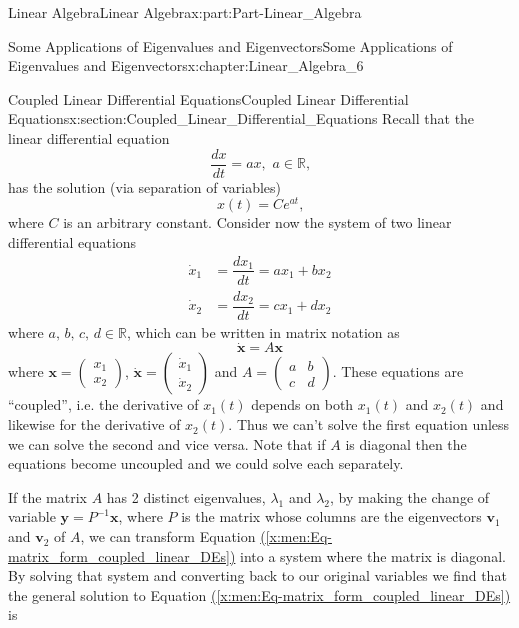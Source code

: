 \documentclass[oneside,10pt,]{book}
\newcommand{\xreffont}{\relax}
\numberwithin{equation}{section}
\newcommand{\bm}[1]{\boldsymbol{#1}}
\newcommand{\amp}{&}
\begin{document}
\begin{partptx}{Linear Algebra}{}{Linear Algebra}{}{}{x:part:Part-Linear_Algebra}
\begin{chapterptx}{Some Applications of Eigenvalues and Eigenvectors}{}{Some Applications of Eigenvalues and Eigenvectors}{}{}{x:chapter:Linear_Algebra_6}
\begin{sectionptx}{Coupled Linear Differential Equations}{}{Coupled Linear Differential Equations}{}{}{x:section:Coupled_Linear_Differential_Equations}
Recall that the linear differential equation%
\begin{equation*}
\dfrac{dx}{dt} = ax, \, \, a \in \mathbb{R}\text{,}
\end{equation*}
has the solution (via separation of variables)%
\begin{equation*}
x(t) = C e^{at}\text{,}
\end{equation*}
where \(C\) is an arbitrary constant. Consider now the system of two linear differential equations%
\begin{align*}
\dot{x}_1 \amp = \dfrac{dx_1}{dt} = ax_1 + bx_2\\
\dot{x}_2 \amp = \dfrac{dx_2}{dt} = cx_1 + dx_2
\end{align*}
where \(a, \, b, \, c, \, d \in \mathbb{R}\), which can be written in matrix notation as%
\begin{equation}
\dot{\bm{x}} = A \bm{x}\label{x:men:Eq-matrix_form_coupled_linear_DEs}
\end{equation}
where \(\bm{x} = \begin{pmatrix} x_1 \\ x_2 \end{pmatrix}\), \(\dot{\bm{x}} = \begin{pmatrix} \dot{x}_1 \\ \dot{x}_2 \end{pmatrix}\) and \(A = \begin{pmatrix} a \amp b \\ c \amp d \end{pmatrix}\). These equations are ``coupled'', i.e. the derivative of \(x_1(t)\) depends on both \(x_1(t)\) and \(x_2(t)\) and likewise for the derivative of \(x_2(t)\). Thus we can’t solve the first equation unless we can solve the second and vice versa. Note that if \(A\) is diagonal then the equations become uncoupled and we could solve each separately.%
\par
If the matrix \(A\) has 2 distinct eigenvalues, \(\lambda_1\) and \(\lambda_2\), by making the change of variable \(\bm{y} = P^{-1} \bm{x}\), where \(P\) is the matrix whose columns are the eigenvectors \(\bm{v}_1\) and \(\bm{v}_2\) of \(A\), we can transform Equation \hyperref[x:men:Eq-matrix_form_coupled_linear_DEs]{({\xreffont\ref{x:men:Eq-matrix_form_coupled_linear_DEs}})} into a system where the matrix is diagonal. By solving that system and converting back to our original variables we find that the general solution to Equation \hyperref[x:men:Eq-matrix_form_coupled_linear_DEs]{({\xreffont\ref{x:men:Eq-matrix_form_coupled_linear_DEs}})} is%

\end{sectionptx}
\end{chapterptx}
\end{partptx}
\end{document}
